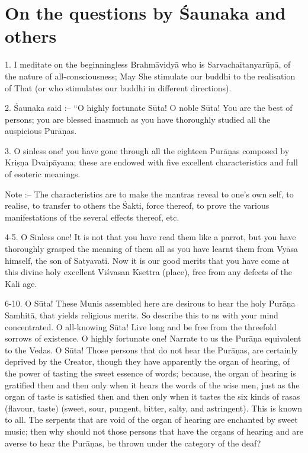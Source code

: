 \chapter{On the questions by \'Saunaka and others}

1. I meditate on the beginningless Brahm\=avidy\=a who is Sarvachaitanyar\=up\=a, of the nature of all-consciousness; May She stimulate our buddhi to the realisation of That (or who stimulates our buddhi in different directions).

2. \'Saunaka said :-- ``O highly fortunate S\=uta! O noble S\=uta! You are the best of persons; you are blessed inasmuch as you have thoroughly studied all the auspicious Pur\=a\d{n}as.

3. O sinless one! you have gone through all the eighteen Pur\=a\d{n}as composed by Kri\d{s}\d{n}a Dvaip\=ayana; these are endowed with five excellent characteristics and full of esoteric meanings.

Note :-- The characteristics are to make the mantras reveal to one's own self, to realise, to transfer to others the \'Sakti, force thereof, to prove the various manifestations of the several effects thereof, etc.

4-5. O Sinless one! It is not that you have read them like a parrot, but you have thoroughly grasped the meaning of them all as you have learnt them from Vy\=asa himself, the son of Satyavati. Now it is our good merits that you have come at this divine holy excellent Vi\'svasan Ksettra (place), free from any defects of the Kali age.

6-10. O S\=uta! These Munis assembled here are desirous to hear the holy Pur\=a\d{n}a Samhit\=a, that yields religious merits. So describe this to ns with your mind concentrated. O all-knowing S\=uta! Live long and be free from the threefold sorrows of existence. O highly fortunate one! Narrate to us the Pur\=a\d{n}a equivalent to the Vedas. O S\=uta! Those persons that do not hear the Pur\=a\d{n}as, are certainly deprived by the Creator, though they have apparently the organ of hearing, of the power of tasting the sweet essence of words; because, the organ of hearing is gratified then and then only when it hears the words of the wise men, just as the organ of taste is satisfied then and then only when it tastes the six kinds of rasas (flavour, taste) (sweet, sour, pungent, bitter, salty, and astringent). This is known to all. The serpents that are void of the organ of hearing are enchanted by sweet music; then why should not those persons that have the organs of hearing and are averse to hear the Pur\=a\d{n}as, be thrown under the category of the deaf?

